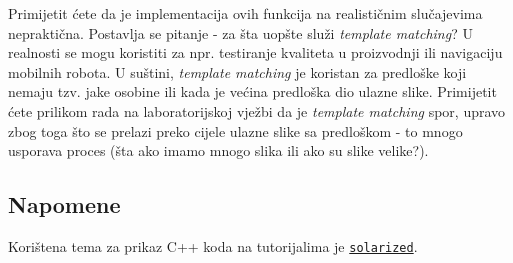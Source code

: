 \documentclass[a4paper, 12pt]{article}
\begin{document}
Primijetit ćete da je implementacija ovih funkcija na realističnim slučajevima nepraktična. Postavlja se pitanje - za šta uopšte služi \textit{template matching}? U realnosti se mogu koristiti za npr. testiranje kvaliteta u proizvodnji ili navigaciju mobilnih robota. U suštini, \textit{template matching} je koristan za predloške koji nemaju tzv. jake osobine ili kada je većina predloška dio ulazne slike. Primijetit ćete prilikom rada na laboratorijskoj vježbi da je \textit{template matching} spor, upravo zbog toga što se prelazi preko cijele ulazne slike sa predloškom - to mnogo usporava proces (šta ako imamo mnogo slika ili ako su slike velike?). 

\subsection*{Napomene}

Korištena tema za prikaz C++ koda na tutorijalima je \href{https://ethanschoonover.com/solarized/}{\lstinline{solarized}}\cite{solarized}.

\printbibliography
\end{document}
